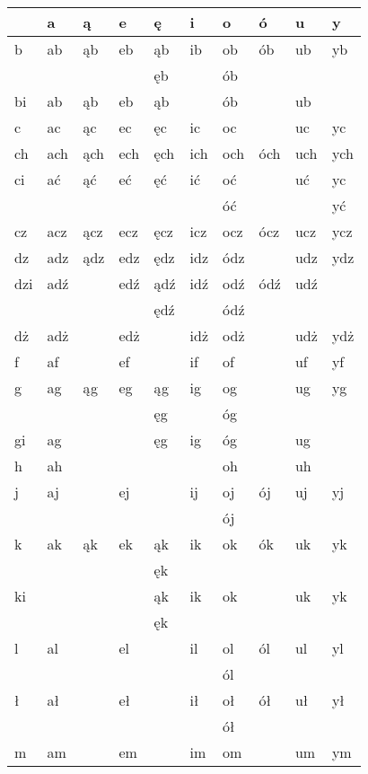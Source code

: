 \documentclass{article}
\begin{document}
\begin{longtable}{p{4mm}|p{4mm}p{4mm}p{4mm}p{4mm}p{4mm}p{4mm}p{4mm}p{4mm}p{4mm}}
 & a & ą & e & ę & i & o & ó & u & y\\
\hline
b & ab & ąb & eb & ąb & ib & ob & ób & ub & yb\\
 &  &  &  & ęb &  & ób &  &  & \\
\hline
bi & ab & ąb & eb & ąb &  & ób &  & ub & \\
\hline
c & ac & ąc & ec & ęc & ic & oc &  & uc & yc\\
\hline
ch & ach & ąch & ech & ęch & ich & och & óch & uch & ych\\
\hline
ci & ać & ąć & eć & ęć & ić & oć &  & uć & yc\\
 &  &  &  &  &  & óć &  &  & yć\\
\hline
cz & acz & ącz & ecz & ęcz & icz & ocz & ócz & ucz & ycz\\
\hline
dz & adz & ądz & edz & ędz & idz & ódz &  & udz & ydz\\
\hline
dzi & adź &  & edź & ądź & idź & odź & ódź & udź & \\
 &  &  &  & ędź &  & ódź &  &  & \\
\hline
dż & adż &  & edż &  & idż & odż &  & udż & ydż\\
\hline
f & af &  & ef &  & if & of &  & uf & yf\\
\hline
g & ag & ąg & eg & ąg & ig & og &  & ug & yg\\
 &  &  &  & ęg &  & óg &  &  & \\
\hline
gi & ag &  &  & ęg & ig & óg &  & ug & \\
\hline
h & ah &  &  &  &  & oh &  & uh & \\
\hline
j & aj &  & ej &  & ij & oj & ój & uj & yj\\
 &  &  &  &  &  & ój &  &  & \\
\hline
k & ak & ąk & ek & ąk & ik & ok & ók & uk & yk\\
 &  &  &  & ęk &  &  &  &  & \\
\hline
ki &  &  &  & ąk & ik & ok &  & uk & yk\\
 &  &  &  & ęk &  &  &  &  & \\
\hline
l & al &  & el &  & il & ol & ól & ul & yl\\
 &  &  &  &  &  & ól &  &  & \\
\hline
ł & ał &  & eł &  & ił & oł & ół & uł & ył\\
 &  &  &  &  &  & ół &  &  & \\
\hline
m & am &  & em &  & im & om &  & um & ym\\

\end{longtable}
\end{document}
